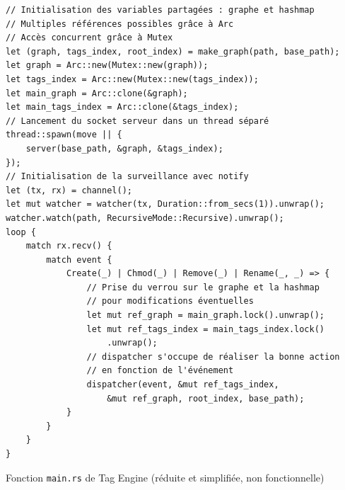\bigbreak
\begin{code}
    \begin{verbatim}
// Initialisation des variables partagées : graphe et hashmap
// Multiples références possibles grâce à Arc 
// Accès concurrent grâce à Mutex
let (graph, tags_index, root_index) = make_graph(path, base_path);
let graph = Arc::new(Mutex::new(graph));
let tags_index = Arc::new(Mutex::new(tags_index));
let main_graph = Arc::clone(&graph);
let main_tags_index = Arc::clone(&tags_index);
// Lancement du socket serveur dans un thread séparé
thread::spawn(move || {
    server(base_path, &graph, &tags_index);
});
// Initialisation de la surveillance avec notify
let (tx, rx) = channel();
let mut watcher = watcher(tx, Duration::from_secs(1)).unwrap();
watcher.watch(path, RecursiveMode::Recursive).unwrap();
loop {
    match rx.recv() {
        match event {
            Create(_) | Chmod(_) | Remove(_) | Rename(_, _) => {
                // Prise du verrou sur le graphe et la hashmap 
                // pour modifications éventuelles
                let mut ref_graph = main_graph.lock().unwrap();
                let mut ref_tags_index = main_tags_index.lock()
                    .unwrap();
                // dispatcher s'occupe de réaliser la bonne action
                // en fonction de l'événement
                dispatcher(event, &mut ref_tags_index,
                    &mut ref_graph, root_index, base_path);
            }
        }
    }
}
    \end{verbatim}
    \caption{Fonction \texttt{main.rs} de Tag Engine (réduite et simplifiée, non fonctionnelle)}
    \label{tag_engine_notify_main}
\end{code}
\bigbreak

